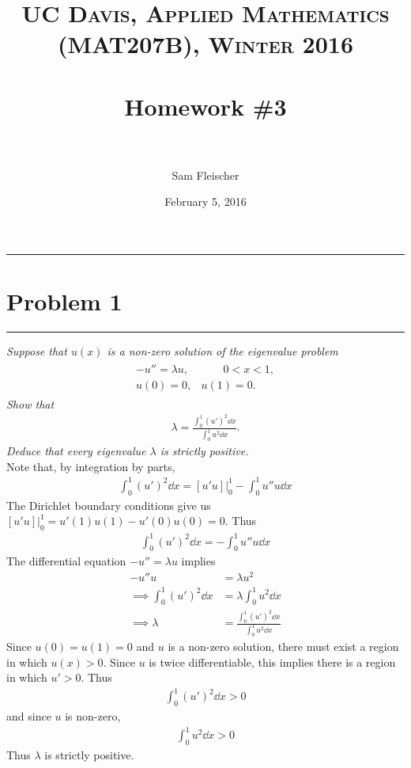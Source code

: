 \documentclass[fontsize=11pt]{article} %
\title{	
\normalfont \normalsize 
\textsc{UC Davis, Applied Mathematics (MAT207B), Winter 2016} \\ [25pt] %
\horrule{2pt} \\[0.4cm] %
\Huge Homework \#3 \\ %
\horrule{2pt} \\[0.5cm] %
}
\author{\huge Sam Fleischer} %
\date{February 5, 2016} %
\theoremstyle{plain}
\numberwithin{equation}{section} %
\numberwithin{figure}{section} %
\numberwithin{table}{section} %
\begin{document}
\thispagestyle{empty}

\maketitle %

\makeatletter
{}
\makeatother

\pagebreak

\begin{center}
    \noindent\rule{5cm}{1pt}
\end{center}
\section{\bf Problem 1}
\begin{center}
    \noindent\rule{5cm}{1pt}
\end{center}

\emph{Suppose that $u(x)$ is a non-zero solution of the eigenvalue problem}
\begin{align*}
    \begin{array}{rr}
        -u'' = \lambda u, &\qquad 0 < x < 1,\\
        u(0) = 0, & u(1) = 0.
    \end{array}
\end{align*}
\emph{Show that}
\begin{align*}
    \lambda = \frac{\int_0^1 (u')^2 \dd x}{\int_0^1 u^2 \dd x}.
\end{align*}
\emph{Deduce that every eigenvalue $\lambda$ is strictly positive.} \\

Note that, by integration by parts,
\begin{align*}
    \int_0^1 (u')^2\dd x = [u' u]\Big|_0^1 - \int_0^1 u'' u \dd x
\end{align*}
The Dirichlet boundary conditions give us $[u' u]\Big|_0^1 = u'(1)u(1) - u'(0)u(0) = 0$.  Thus
\begin{align*}
    \int_0^1 (u')^2 \dd x = -\int_0^1 u'' u \dd x
\end{align*}
The differential equation $-u'' = \lambda u$ implies
\begin{align*}
    -u'' u &= \lambda u^2 \\
    \implies \int_0^1 (u')^2 \dd x &= \lambda \int_0^1 u^2 \dd x \\
    \implies \lambda &= \frac{\int_0^1(u')^2 \dd x}{\int_0^1 u^2 \dd x}
\end{align*}
Since $u(0) = u(1) = 0$ and $u$ is a non-zero solution, there must exist a region in which $u(x) > 0$.  Since $u$ is twice differentiable, this implies there is a region in which $u' > 0$.  Thus
\begin{align*}
    \int_0^1 (u')^2 \dd x > 0
\end{align*}
and since $u$ is non-zero,
\begin{align*}
    \int_0^1 u^2 \dd x > 0
\end{align*}
Thus $\lambda$ is strictly positive.
\end{document}
